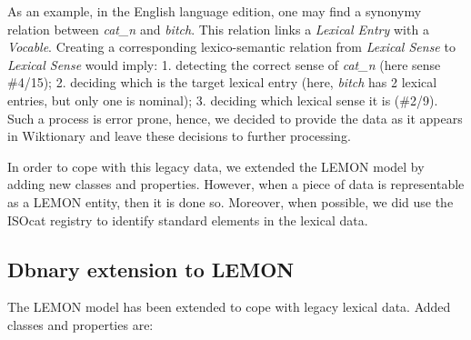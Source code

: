 \documentclass[sw]{iosart2c}
\begin{document}
As an example, in the English language edition, one may find a synonymy relation between \textit{cat\_n} and \textit{bitch}. This relation links a \textit{Lexical Entry} with a \textit{Vocable}. Creating a corresponding lexico-semantic relation from \textit{Lexical Sense} to \textit{Lexical Sense} would imply: 1. detecting the correct sense of \textit{cat\_n} (here sense \#4/15); 2. deciding which is the target lexical entry (here, \textit{bitch} has 2 lexical entries, but only one is nominal); 3. deciding which lexical sense it is (\#2/9). Such a process is error prone, hence, we decided to provide the data as it appears in Wiktionary and leave these decisions to further processing.

In order to cope with this legacy data, we extended the LEMON model by adding new classes and properties. However, when a piece of data is representable as a LEMON entity, then it is done so. Moreover, when possible, we did use the ISOcat registry \cite{windhouwer2012linking} to identify standard elements in the lexical data.

\subsection{Dbnary extension to LEMON}

The LEMON model has been extended to cope with legacy lexical data. Added classes and properties are:
\end{document}
